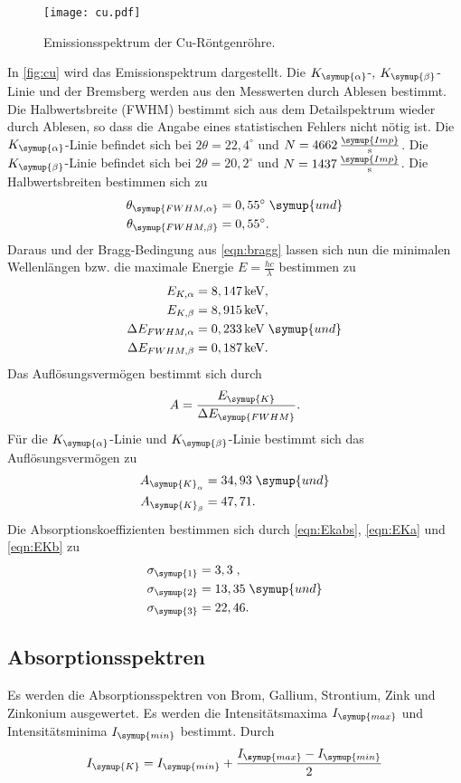 \begin{figure}
  \centering
  \texttt{[image: cu.pdf]}
  \caption{Emissionsspektrum der Cu-Röntgenröhre.}
  \label{fig:cu}
\end{figure}
In \autoref{fig:cu} wird das Emissionspektrum dargestellt. Die $K_{\symup{\alpha}}$-, $K_{\symup{\beta}}$-Linie und
der Bremsberg werden aus den Messwerten durch Ablesen bestimmt. Die Halbwertsbreite (FWHM) bestimmt sich aus dem
Detailspektrum wieder durch Ablesen, so dass die Angabe eines statistischen Fehlers nicht nötig ist.
Die $K_{\symup{\alpha}}$-Linie befindet sich bei $2\theta=22,4^{\circ}$ und 
$N = 4662\,\frac{\symup{Imp}}{\unit{\second}}$. Die $K_{\symup{\beta}}$-Linie befindet sich bei 
$2\theta=20,2^{\circ}$ und $N = 1437\,\frac{\symup{Imp}}{\unit{\second}}$. Die Halbwertsbreiten bestimmen sich zu
\begin{align*}
  \theta_{\symup{FWHM, \alpha}} &= 0,55^{\circ} \; \symup{und} \\
  \theta_{\symup{FWHM, \beta}} &= 0,55^{\circ}. 
\end{align*}
Daraus und der Bragg-Bedingung aus \autoref{eqn:bragg} lassen sich nun die minimalen Wellenlängen bzw.
die maximale Energie $E = \frac{hc}{\lambda}$ bestimmen zu
\begin{align*}
  E_{K,\alpha}           &= 8,147\,\unit{\kilo\eV},\\
  E_{K, \beta}           &= 8,915\,\unit{\kilo\eV},\\
  \Delta E_{FWHM,\alpha} &= 0,233\,\unit{\kilo\eV} \; \symup{und}\\
  \Delta E_{FWHM,\beta}  &= 0,187\,\unit{\kilo\eV}.
\end{align*}
Das Auflösungsvermögen bestimmt sich durch
\begin{align*}
  A = \frac{E_{\symup{K}}}{\Delta E_{\symup{FWHM}}}.
\end{align*}
Für die $K_{\symup{\alpha}}$-Linie und $K_{\symup{\beta}}$-Linie bestimmt sich das Auflösungsvermögen zu
\begin{align*}
  A_{\symup{K}_{\alpha}}  &=  34,93 \; \symup{und}\\
  A_{\symup{K}_{\beta}}   &= 47,71.
\end{align*}
Die Absorptionskoeffizienten bestimmen sich durch \autoref{eqn:Ekabs}, \autoref{eqn:EKa} und
\autoref{eqn:EKb} zu
\begin{align*}
  \sigma_{\symup{1}} &= 3,3\;,\\
  \sigma_{\symup{2}} &= 13,35\; \symup{und}\\
  \sigma_{\symup{3}} &= 22,46.
\end{align*}

\subsection{Absorptionsspektren}
\label{sec:Absorptionsspektren}
Es werden die Absorptionsspektren von Brom, Gallium, Strontium, Zink und Zinkonium ausgewertet. Es werden die
Intensitätsmaxima $I_{\symup{max}}$ und Intensitätsminima $I_{\symup{min}}$ bestimmt. Durch
\begin{align*}
  I_{\symup{K}} = I_{\symup{min}} + \frac{I_{\symup{max}} - I_{\symup{min}}}{2}
\end{align*}